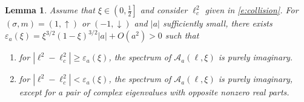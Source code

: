 \documentclass[12pt]{amsart}    %
\renewcommand{\geq}{\geqslant}
\renewcommand{\leq}{\leqslant}
\renewcommand{\k}{\kappa}
\newcommand{\oneu}{(1,\uparrow)}
\newcommand{\mind}{(-1,\downarrow)}
\newtheorem{lemma}[theorem]{Lemma}
\numberwithin{equation}{section}
\begin{document}
\begin{lemma} \label{lem:nonperu1}
Assume that $\xi\in\left(0,\frac12\right]$ and consider $\ell^2_c$ given in \eqref{e:collision}.   
For $(\sigma,m)=\oneu $ or $\mind$ and $|a|$ sufficiently small, there exists $\varepsilon_a(\xi) = \xi^{3/2}(1-\xi)^{3/2}|a|+O(a^2)>0$ such that
\begin{enumerate}
    \item for $|\ell^2-\ell_c^2|\geq \varepsilon_a(\xi)$, the spectrum of $\mathcal A_a(\ell,\xi)$ is purely imaginary.
    \item for $|\ell^2-\ell_c^2|< \varepsilon_a(\xi)$, the spectrum of $\mathcal A_a(\ell,\xi)$ is purely imaginary, except for a pair of complex eigenvalues with opposite nonzero real parts.
\end{enumerate}
\end{lemma}
\end{document}
